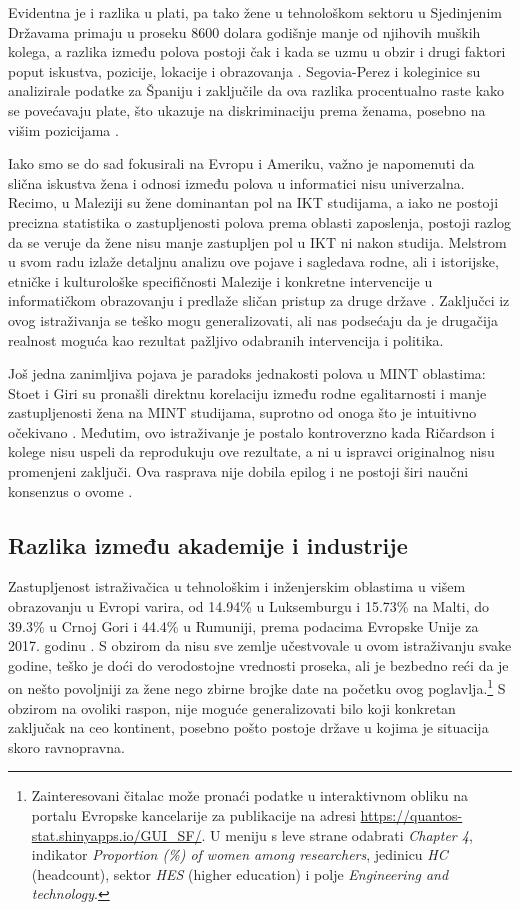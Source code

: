 Evidentna je i razlika u plati, pa tako žene u tehnološkom sektoru u Sjedinjenim Državama primaju u proseku 8600 dolara godišnje manje od njihovih muških kolega, a razlika između polova postoji čak i kada se uzmu u obzir i drugi faktori poput iskustva, pozicije, lokacije i obrazovanja \cite{dhi}. Segovia-Perez i koleginice su analizirale podatke za Španiju i zaključile da ova razlika procentualno raste kako se povećavaju plate, što ukazuje na diskriminaciju prema ženama, posebno na višim pozicijama \cite{segovia}.

Iako smo se do sad fokusirali na Evropu i Ameriku, važno je napomenuti da slična iskustva žena i odnosi između polova u informatici nisu univerzalna. Recimo, u Maleziji su žene dominantan pol na IKT studijama, a iako ne postoji precizna statistika o zastupljenosti polova prema oblasti zaposlenja, postoji razlog da se veruje da žene nisu manje zastupljen pol u IKT ni nakon studija. Melstrom u svom radu izlaže detaljnu analizu ove pojave i sagledava rodne, ali i istorijske, etničke i kulturološke specifičnosti Malezije i konkretne intervencije u informatičkom obrazovanju i predlaže sličan pristup za druge države  \cite{mellstrom}. Zaključci iz ovog istraživanja se teško mogu generalizovati, ali nas podsećaju da je drugačija realnost moguća kao rezultat pažljivo odabranih intervencija i politika.

Još jedna zanimljiva pojava je paradoks jednakosti polova u MINT oblastima: Stoet i Giri su pronašli direktnu korelaciju između rodne egalitarnosti i manje zastupljenosti žena na MINT studijama, suprotno od onoga što je intuitivno očekivano \cite{stoet}. Međutim, ovo istraživanje je postalo kontroverzno kada Ričardson i kolege\cite{richardson} nisu uspeli da reprodukuju ove rezultate, a ni u ispravci originalnog nisu promenjeni zaključi. Ova rasprava nije dobila epilog i ne postoji širi naučni konsenzus o ovome \cite{schleunes-scientist}.
\subsection{Razlika između akademije i industrije}
Zastupljenost istraživačica u tehnološkim i inženjerskim oblastima u višem obrazovanju u Evropi varira, od 14.94\% u Luksemburgu i 15.73\% na Malti, do 39.3\% u Crnoj Gori i 44.4\% u Rumuniji, prema podacima Evropske Unije za 2017. godinu \cite{shefigures}. S obzirom da nisu sve zemlje učestvovale u ovom istraživanju svake godine, teško je doći do verodostojne vrednosti proseka, ali je bezbedno reći da je on nešto povoljniji za žene nego zbirne brojke date na početku ovog poglavlja.\footnote{Zainteresovani čitalac može pronaći podatke u interaktivnom obliku na portalu Evropske kancelarije za publikacije na adresi \url{https://quantos-stat.shinyapps.io/GUI_SF/}. U meniju s leve strane odabrati \emph{Chapter 4}, indikator \emph{Proportion (\%) of women among researchers}, jedinicu \emph{HC} (headcount), sektor \emph{HES} (higher education) i polje \emph{Engineering and technology}.} S obzirom na ovoliki raspon, nije moguće generalizovati bilo koji konkretan zaključak na ceo kontinent, posebno pošto postoje države u kojima je situacija skoro ravnopravna.

